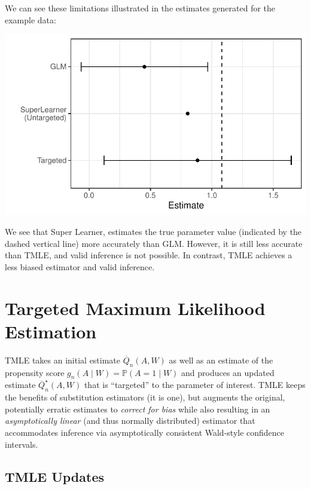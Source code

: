 \documentclass[12pt, krantz2,]{book}
\theoremstyle{definition}
\theoremstyle{definition}
\theoremstyle{definition}
\newcommand{\1}{\mathbbm{1}}
\begin{document}
We can see these limitations illustrated in the estimates generated for the
example data:

\begin{center}\includegraphics[width=0.8\linewidth]{img/misc/tmle_sim/schematic_3_effects} \end{center}

We see that Super Learner, estimates the true parameter value (indicated by the
dashed vertical line) more accurately than GLM. However, it is still less
accurate than TMLE, and valid inference is not possible. In contrast, TMLE
achieves a less biased estimator and valid inference.

\hypertarget{tmle}{%
\section{Targeted Maximum Likelihood Estimation}\label{tmle}}

TMLE takes an initial estimate \(\overline{Q}_n(A,W)\) as well as an estimate of
the propensity score \(g_n(A \mid W) = \mathbb{P}(A = 1 \mid W)\) and produces an
updated estimate \(\overline{Q}^{\star}_n(A,W)\) that is ``targeted'' to the
parameter of interest. TMLE keeps the benefits of substitution estimators (it is
one), but augments the original, potentially erratic estimates to \emph{correct for
bias} while also resulting in an \emph{asymptotically linear} (and thus normally
distributed) estimator that accommodates inference via asymptotically consistent
Wald-style confidence intervals.

\hypertarget{tmle-updates}{%
\subsection{TMLE Updates}\label{tmle-updates}}
\end{document}
